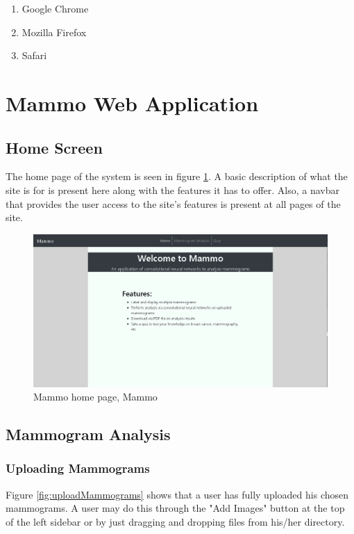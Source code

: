 \documentclass[11pt,a4paper,titlepage]{article}
\let\stdsection\section
\renewcommand\section{\newpage\stdsection}
\newcommand{\+}{\discretionary{\mbox{${\bm\cdot}\mkern-1mu$}}{}{}}
\begin{document}
			\begin{enumerate}
				\item{Google Chrome}
				\item{Mozilla Firefox}
				\item{Safari}
			\end{enumerate}

\section{Mammo Web Application}
	\subsection{Home Screen}
	\qquad The home page of the system is seen in  figure \ref{fig:mammoHome}. A basic description of what the site is for is present here along with the features it has to offer. Also, a navbar that provides the user access to the site's features is present at all pages of the site.
	
	\begin{figure}[h]
		\centering
	  	\includegraphics[scale=0.5]{images/mammoHome.png}
		\caption{Mammo home page, Mammo}
	  	\label{fig:mammoHome}
	\end{figure}
	
	\subsection{Mammogram Analysis}
	
	\subsubsection{Uploading Mammograms}
	\qquad Figure \ref{fig:uploadMammograms} shows that a user has fully uploaded his chosen mammograms. A user may do this through the "Add Images" button at the top of the left sidebar or by just dragging and dropping files from his/her directory.
	
\end{document}
